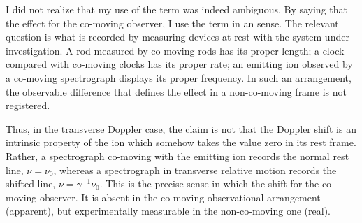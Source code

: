 \documentclass[submitted,11pt]{article}
\begin{document}
\begin{reply}


I did not realize that my use of the term  was indeed ambiguous. By saying that the effect  for the co-moving observer, I use the term in an  sense. The relevant question is what is recorded by measuring devices at rest with the system under investigation. A rod measured by co-moving rods has its proper length; a clock compared with co-moving clocks has its proper rate; an emitting ion observed by a co-moving spectrograph displays its proper frequency. In such an arrangement, the observable difference that defines the effect in a non-co-moving frame is not registered.

Thus, in the transverse Doppler case, the claim is not that the Doppler shift is an intrinsic property of the ion which somehow takes the value zero in its rest frame. Rather, a spectrograph co-moving with the emitting ion records the normal rest line, \(\nu=\nu_0\), whereas a spectrograph in transverse relative motion records the shifted line, \(\nu=\gamma^{-1}\nu_0\). This is the precise sense in which the shift  for the co-moving observer. It is absent in the co-moving observational arrangement (apparent), but experimentally measurable in the non-co-moving one (real).

\end{reply}
\end{document}

